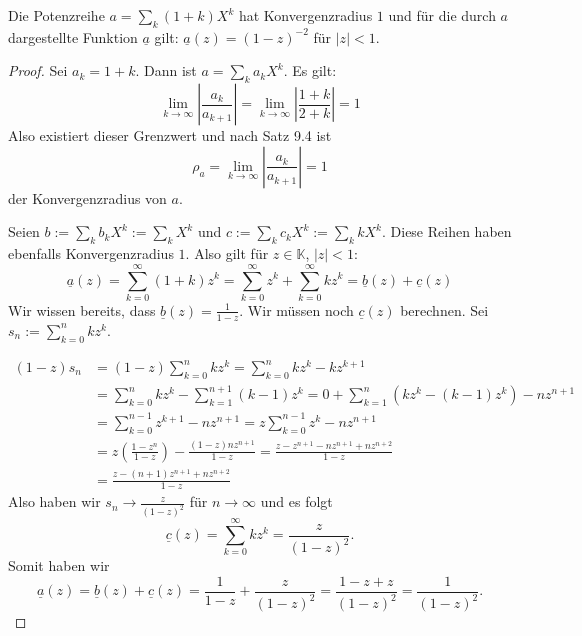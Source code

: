 \setcounter{aufgabe}{1}
\begin{aufgabe}
Die Potenzreihe $a = \sum_k (1+k) X^k$ hat Konvergenzradius $1$ und
für die durch $a$ dargestellte Funktion $\underline a$ gilt: 
$\underline{a}(z) = (1-z)^{-2}$ für $|z| < 1$.
\end{aufgabe}
\begin{proof}
Sei $a_k = 1+k$. Dann ist $a = \sum_k a_k X^k$. Es gilt:
\[
\lim_{k \to \infty} \left| \frac{a_k}{a_{k+1}} \right| = \lim_{k \to \infty}
	\left| \frac{1+k}{2+k} \right| = 1
\]
Also existiert dieser Grenzwert und nach Satz 9.4 ist
\[
\rho_a = \lim_{k \to \infty} \left| \frac{a_k}{a_{k+1}} \right| = 1
\]
der Konvergenzradius von $a$.

Seien $b := \sum_k b_k X^k := \sum_k X^k$ und $c := \sum_k c_k X^k := \sum_k k X^k$.
Diese Reihen haben ebenfalls Konvergenzradius $1$. Also gilt für $z \in \mathbb K$, 
$|z| < 1$:
\[
\underline a(z) = \sum_{k=0}^\infty (1+k) z^k = \sum_{k=0}^\infty z^k + \sum_{k=0}^\infty k z^k
	= \underline b(z) + \underline c(z)
\]
Wir wissen bereits, dass $\underline b(z) = \frac{1}{1-z}$. Wir müssen noch $\underline c(z)$
berechnen. Sei $s_n := \sum_{k=0}^n k z^k$.

\begin{align*}
(1-z) s_n &= (1-z) \sum_{k=0}^n k z^k = \sum_{k=0}^n kz^k - k z^{k+1} \\
					&= \sum_{k=0}^n k z^k - \sum_{k=1}^{n+1} (k-1) z^k
					= 0 + \sum_{k=1}^n ( k z^k - (k-1) z^k ) - n z^{n+1} \\
					&= \sum_{k=0}^{n-1} z^{k+1} - n z^{n+1} = z \sum_{k=0}^{n-1} z^k - n z^{n+1} \\
					&= z \left( \frac{1-z^n}{1-z} \right) - \frac{(1-z) n z^{n+1}}{1-z}
					= \frac{z - z^{n+1} - n z^{n+1} + n z^{n+2}}{1-z} \\
					&= \frac{z - (n+1) z^{n+1} + n z^{n+2}}{1-z}
\end{align*}
Also haben wir $s_n \to \frac{z}{(1-z)^2}$ für $n \to \infty$ und es folgt
\[
\underline c(z) = \sum_{k=0}^\infty k z^k = \frac{z}{(1-z)^2} .
\]
Somit haben wir
\[
\underline a(z) = \underline b(z) + \underline c(z) = \frac{1}{1-z} + \frac{z}{(1-z)^2}
	= \frac{1 -z + z}{(1-z)^2} = \frac{1}{(1-z)^2} .
\]
\end{proof}

